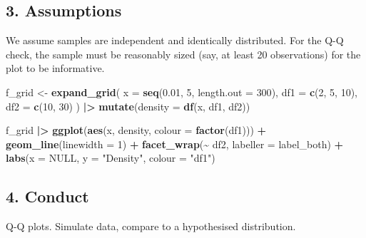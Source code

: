 \documentclass[
]{article}
\newenvironment{Shaded}{\begin{snugshade}}{\end{snugshade}}
\newcommand{\AttributeTok}[1]{\textcolor[rgb]{0.13,0.29,0.53}{#1}}
\newcommand{\ConstantTok}[1]{\textcolor[rgb]{0.56,0.35,0.01}{#1}}
\newcommand{\DecValTok}[1]{\textcolor[rgb]{0.00,0.00,0.81}{#1}}
\newcommand{\FloatTok}[1]{\textcolor[rgb]{0.00,0.00,0.81}{#1}}
\newcommand{\FunctionTok}[1]{\textcolor[rgb]{0.13,0.29,0.53}{\textbf{#1}}}
\newcommand{\NormalTok}[1]{#1}
\newcommand{\OtherTok}[1]{\textcolor[rgb]{0.56,0.35,0.01}{#1}}
\newcommand{\SpecialCharTok}[1]{\textcolor[rgb]{0.81,0.36,0.00}{\textbf{#1}}}
\newcommand{\StringTok}[1]{\textcolor[rgb]{0.31,0.60,0.02}{#1}}
\begin{document}
\subsection{3. Assumptions}\label{assumptions}

We assume samples are independent and identically distributed. For the
Q-Q check, the sample must be reasonably sized (say, at least 20
observations) for the plot to be informative.

\begin{Shaded}
\begin{Highlighting}[]
\NormalTok{f\_grid }\OtherTok{\textless{}{-}} \FunctionTok{expand\_grid}\NormalTok{(}
  \AttributeTok{x  =} \FunctionTok{seq}\NormalTok{(}\FloatTok{0.01}\NormalTok{, }\DecValTok{5}\NormalTok{, }\AttributeTok{length.out =} \DecValTok{300}\NormalTok{),}
  \AttributeTok{df1 =} \FunctionTok{c}\NormalTok{(}\DecValTok{2}\NormalTok{, }\DecValTok{5}\NormalTok{, }\DecValTok{10}\NormalTok{),}
  \AttributeTok{df2 =} \FunctionTok{c}\NormalTok{(}\DecValTok{10}\NormalTok{, }\DecValTok{30}\NormalTok{)}
\NormalTok{) }\SpecialCharTok{|\textgreater{}}
  \FunctionTok{mutate}\NormalTok{(}\AttributeTok{density =} \FunctionTok{df}\NormalTok{(x, df1, df2))}
\end{Highlighting}
\end{Shaded}

\begin{Shaded}
\begin{Highlighting}[]
\NormalTok{f\_grid }\SpecialCharTok{|\textgreater{}}
  \FunctionTok{ggplot}\NormalTok{(}\FunctionTok{aes}\NormalTok{(x, density, }\AttributeTok{colour =} \FunctionTok{factor}\NormalTok{(df1))) }\SpecialCharTok{+}
  \FunctionTok{geom\_line}\NormalTok{(}\AttributeTok{linewidth =} \DecValTok{1}\NormalTok{) }\SpecialCharTok{+}
  \FunctionTok{facet\_wrap}\NormalTok{(}\SpecialCharTok{\textasciitilde{}}\NormalTok{ df2, }\AttributeTok{labeller =}\NormalTok{ label\_both) }\SpecialCharTok{+}
  \FunctionTok{labs}\NormalTok{(}\AttributeTok{x =} \ConstantTok{NULL}\NormalTok{, }\AttributeTok{y =} \StringTok{"Density"}\NormalTok{, }\AttributeTok{colour =} \StringTok{"df1"}\NormalTok{)}
\end{Highlighting}
\end{Shaded}

\subsection{4. Conduct}\label{conduct}

Q-Q plots. Simulate data, compare to a hypothesised distribution.
\end{document}
